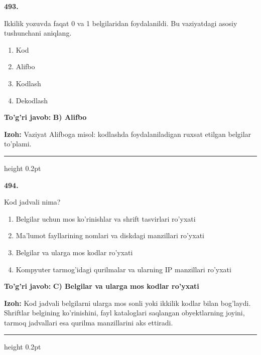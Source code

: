 \documentclass[10pt,a4paper,oneside]{article}
\begin{document}
\noindent\textbf{\color{ink}493.}
\par
Ikkilik yozuvda faqat 0 va 1 belgilaridan foydalanildi. Bu vaziyatdagi asosiy tushunchani aniqlang.
\begin{enumerate}[label=\Alph*),leftmargin=9mm]
\item Kod
\item Alifbo
\item Kodlash
\item Dekodlash
\end{enumerate}
\begin{tcolorbox}[enhanced,breakable,colback=teal!4,colframe=teal!50!black,boxrule=0.5pt,arc=1.1mm,left=3mm,right=3mm,top=1.7mm,bottom=1.7mm,before skip=2mm,after skip=2mm]
\textbf{\color{teal}To'g'ri javob:} \textbf{B) Alifbo}
\par\smallskip
\textbf{Izoh:} Vaziyat Alifboga misol: kodlashda foydalaniladigan ruxsat etilgan belgilar to'plami.
\end{tcolorbox}
\vspace{2mm}\hrule height 0.2pt \vspace{3mm}

\noindent\textbf{\color{ink}494.}
\par
Kod jadvali nima?
\begin{enumerate}[label=\Alph*),leftmargin=9mm]
\item Belgilar uchun mos ko'rinishlar va shrift tasvirlari ro'yxati
\item Ma'lumot fayllarining nomlari va diskdagi manzillari ro'yxati
\item Belgilar va ularga mos kodlar ro'yxati
\item Kompyuter tarmog'idagi qurilmalar va ularning IP manzillari ro'yxati
\end{enumerate}
\begin{tcolorbox}[enhanced,breakable,colback=teal!4,colframe=teal!50!black,boxrule=0.5pt,arc=1.1mm,left=3mm,right=3mm,top=1.7mm,bottom=1.7mm,before skip=2mm,after skip=2mm]
\textbf{\color{teal}To'g'ri javob:} \textbf{C) Belgilar va ularga mos kodlar ro'yxati}
\par\smallskip
\textbf{Izoh:} Kod jadvali belgilarni ularga mos sonli yoki ikkilik kodlar bilan bog'laydi. Shriftlar belgining ko'rinishini, fayl kataloglari saqlangan obyektlarning joyini, tarmoq jadvallari esa qurilma manzillarini aks ettiradi.
\end{tcolorbox}
\vspace{2mm}\hrule height 0.2pt \vspace{3mm}
\end{document}
